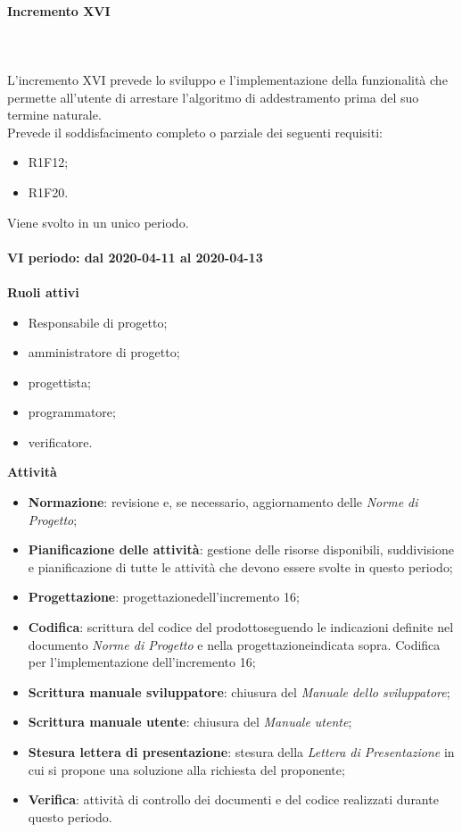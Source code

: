 \paragraph{Incremento XVI} \mbox{} \\ \\
L'incremento XVI prevede lo sviluppo e l'implementazione della funzionalità che permette all'utente di arrestare l'algoritmo di addestramento prima del suo termine naturale.
\\Prevede il soddisfacimento completo o parziale dei seguenti requisiti:
\begin{itemize}
	\item R1F12;
	\item R1F20.
\end{itemize}
Viene svolto in un unico periodo.
\mbox{} \\ \\ \textbf{VI periodo: dal 2020-04-11 al 2020-04-13} \mbox{} \\ \\
\textbf{Ruoli attivi}
\begin{itemize}
	\item Responsabile di progetto\glo;
	\item amministratore di progetto\glo;
	\item progettista;
	\item programmatore;
	\item verificatore.
\end{itemize}
\textbf{Attività} 
\begin{itemize}
	\item \textbf{Normazione}: revisione e, se necessario, aggiornamento delle \textit{Norme di Progetto};
	\item \textbf{Pianificazione delle attività}: gestione delle risorse disponibili, suddivisione e pianificazione di tutte le attività che devono essere svolte in questo periodo;
	\item \textbf{Progettazione}\glo: progettazione\glosp dell'incremento 16;  
	\item \textbf{Codifica}: scrittura del codice del prodotto\glosp seguendo le indicazioni definite nel documento \textit{Norme di Progetto} e nella progettazione\glosp indicata sopra. Codifica per l'implementazione dell'incremento 16;
	\item \textbf{Scrittura manuale sviluppatore}: chiusura del \textit{Manuale dello sviluppatore};
	\item \textbf{Scrittura manuale utente}: chiusura del \textit{Manuale utente};
	\item \textbf{Stesura lettera di presentazione}: stesura della \textit{Lettera di Presentazione} in cui si propone una soluzione alla richiesta del proponente;
	\item \textbf{Verifica}: attività di controllo dei documenti e del codice realizzati durante questo periodo.
\end{itemize}
